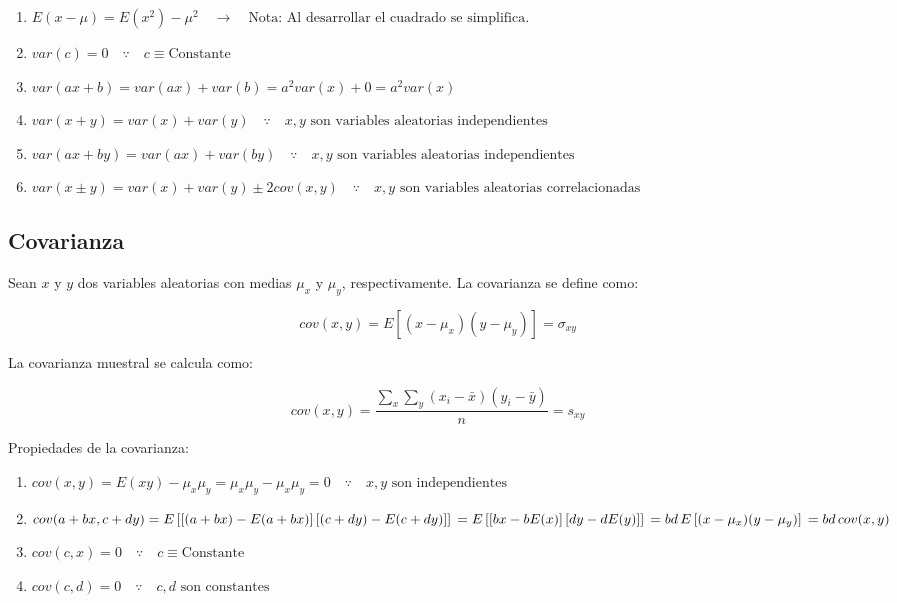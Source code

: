 \documentclass[
]{book}
\providecommand{\tightlist}{%
  \setlength{\itemsep}{0pt}\setlength{\parskip}{0pt}}
\begin{document}
\begin{enumerate}
\def\labelenumi{\arabic{enumi}.}
\tightlist
\item
  \(E(x-\mu) = E(x^2) - \mu^2 \quad \rightarrow \quad \text{Nota: Al desarrollar el cuadrado se simplifica.}\)
\item
  \(var(c)=0 \quad \because \quad c \equiv \text{Constante}\)
\item
  \(var(ax + b) = var(ax) + var(b) = a^2 var(x) + 0 = a^2 var(x)\)
\item
  \(var(x+y) = var(x) + var(y) \quad \because \quad x,y \text{ son variables aleatorias independientes}\)
\item
  \(var(ax + by) = var(ax) + var(by) \quad \because \quad x,y \text{ son variables aleatorias independientes}\)
\item
  \(var(x \pm y) = var(x) + var(y) \pm 2cov(x,y) \quad \because \quad x,y \text{ son variables aleatorias correlacionadas}\)
\end{enumerate}

\hypertarget{covarianza}{%
\subsection{Covarianza}\label{covarianza}}

Sean \(x\) y \(y\) dos variables aleatorias con medias \(\mu_x\) y \(\mu_y\), respectivamente. La covarianza se define como:

\[
cov(x,y) = E[(x-\mu_x)(y-\mu_y)] = \sigma_{xy}
\]

La covarianza muestral se calcula como:

\[
cov(x,y) = \frac{\sum_x \sum_y (x_i - \bar x)(y_i - \bar y)}{n} = s_{xy}
\]

Propiedades de la covarianza:

\begin{enumerate}
\def\labelenumi{\arabic{enumi}.}
\tightlist
\item
  \(cov(x,y) = E(xy) - \mu_x \mu_y = \mu_x \mu_y - \mu_x \mu_y = 0 \quad \because \quad x,y \text{ son independientes}\)
\item
  \(cov(a+bx, c+dy) = E\left[ \left[(a+bx) - E(a+bx)\right]\left[(c+dy) - E(c+dy)\right] \right] \\ = E\left[ \left[ bx - bE(x) \right]\left[ dy - dE(y) \right] \right] \\ = bd \, E\left[(x-\mu_{x})(y-\mu_{y})\right] \\ = bd \, cov(x, y)\)
\item
  \(cov(c,x) = 0 \quad \because \quad c \equiv \text{Constante}\)
\item
  \(cov(c,d) = 0 \quad \because \quad c,d \text{ son constantes}\)
\end{enumerate}
\end{document}
